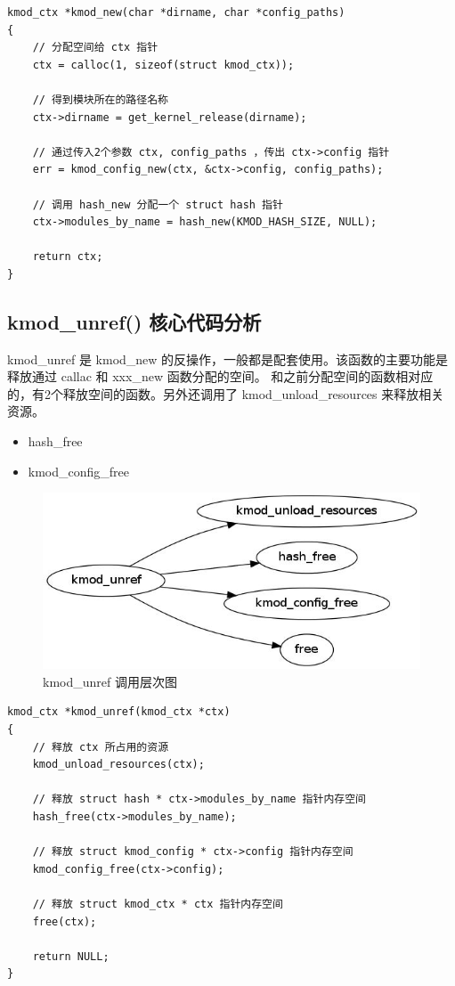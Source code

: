 {\begin{shaded}\begin{verbatim}
kmod_ctx *kmod_new(char *dirname, char *config_paths)
{
    // 分配空间给 ctx 指针
    ctx = calloc(1, sizeof(struct kmod_ctx));

    // 得到模块所在的路径名称
    ctx->dirname = get_kernel_release(dirname);

    // 通过传入2个参数 ctx, config_paths ，传出 ctx->config 指针
    err = kmod_config_new(ctx, &ctx->config, config_paths);

    // 调用 hash_new 分配一个 struct hash 指针
    ctx->modules_by_name = hash_new(KMOD_HASH_SIZE, NULL);

    return ctx;
}
\end{verbatim}\end{shaded}}
\subsection{kmod\_unref() 核心代码分析}

kmod\_unref 是 kmod\_new
的反操作，一般都是配套使用。该函数的主要功能是释放通过 callac 和 xxx\_new
函数分配的空间。
和之前分配空间的函数相对应的，有2个释放空间的函数。另外还调用了
kmod\_unload\_resources 来释放相关资源。

\begin{itemize}
\item
  hash\_free
\item
  kmod\_config\_free
\end{itemize}
\begin{figure}[htbp]
\centering
\includegraphics{./figures/kmod_unref.jpg}
\caption{kmod\_unref 调用层次图}
\end{figure}

{\begin{shaded}\begin{verbatim}
kmod_ctx *kmod_unref(kmod_ctx *ctx)
{
    // 释放 ctx 所占用的资源
    kmod_unload_resources(ctx);

    // 释放 struct hash * ctx->modules_by_name 指针内存空间 
    hash_free(ctx->modules_by_name);

    // 释放 struct kmod_config * ctx->config 指针内存空间 
    kmod_config_free(ctx->config);

    // 释放 struct kmod_ctx * ctx 指针内存空间 
    free(ctx);

    return NULL;
}
\end{verbatim}\end{shaded}}

